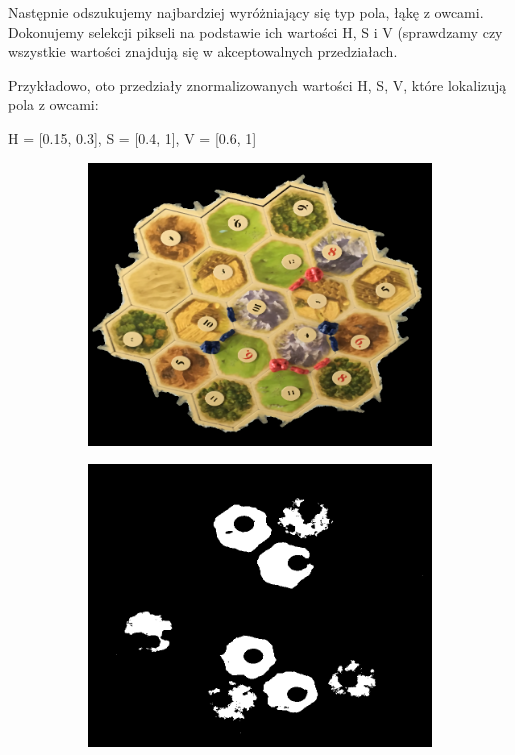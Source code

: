 \documentclass[a4paper]{article}
\begin{document}
    Następnie odszukujemy najbardziej wyróżniający się typ pola, łąkę z owcami. Dokonujemy selekcji pikseli na podstawie ich wartości H, S i V (sprawdzamy czy wszystkie wartości znajdują się w akceptowalnych przedziałach. 
    
    Przykładowo, oto przedziały znormalizowanych wartości H, S, V, które lokalizują pola z owcami:
    
H = [0.15, 0.3], S = [0.4, 1], V = [0.6, 1] 
	
	\begin{figure}[h]
		
        \begin{subfigure}[]{.5\linewidth}
        \includegraphics[width=\linewidth]{pictures/fields/pre_mask.png}
        \end{subfigure}
        \begin{subfigure}[]{0.5\linewidth}
        \includegraphics[width=\linewidth]{pictures/fields/after_mask.png}

\end{subfigure}
\end{figure}
\end{document}
